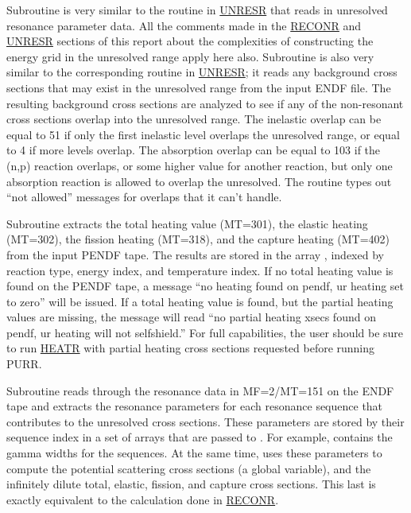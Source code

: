 Subroutine 
is very similar to the routine in \hyperlink{sUNRESRhy}{UNRESR}
that reads in unresolved resonance parameter data.  All the comments
made in the \hyperlink{sRECONRhy}{RECONR} and
\hyperlink{sUNRESRhy}{UNRESR} sections of this report about the
complexities of constructing the energy grid in the unresolved
range apply here also.  Subroutine  is also very
similar to the corresponding routine in
\hyperlink{sUNRESRhy}{UNRESR};
it reads any background cross sections that may
exist in the unresolved range from the input ENDF file.  The
resulting background cross sections are analyzed to see if any of
the non-resonant cross sections overlap into the unresolved range.
The inelastic overlap  can be equal to 51 if only the
first inelastic level overlaps the unresolved range, or equal to 4
if more levels overlap.  The absorption overlap  can be
equal to 103 if the (n,p) reaction overlaps, or some higher value for
another reaction, but only one absorption reaction is allowed to
overlap the unresolved.  The routine types out ``not allowed''
messages for overlaps that it can't handle.

Subroutine 
extracts the total heating value (MT=301),
the elastic heating (MT=302), the fission heating (MT=318), and
the capture heating (MT=402) from the input PENDF tape.  The
results are stored in the array , indexed by reaction
type, energy index, and temperature index.  If no total heating
value is found on the PENDF tape, a message ``no heating found on
pendf, ur heating set to zero'' will be issued.  If a total heating
value is found, but the partial heating values are missing, the
message will read ``no partial heating xsecs found on pendf, ur
heating will not selfshield.''  For full capabilities, the user
should be sure to run \hyperlink{sHEATRhy}{HEATR} with
partial heating cross sections requested before running PURR.

Subroutine 
reads through the resonance data in MF=2/MT=151
on the ENDF tape and extracts the resonance parameters for each
resonance sequence that contributes to the unresolved cross sections.
These parameters are stored by their sequence index in a set of
arrays that are passed to .  For example, 
contains the gamma widths for the sequences.  At the same time,
 uses these parameters to compute the potential scattering
cross sections  (a global variable), and the
infinitely dilute total, elastic, fission, and capture cross sections.
This last is exactly equivalent to the calculation done in
\hyperlink{sRECONRhy}{RECONR}.

